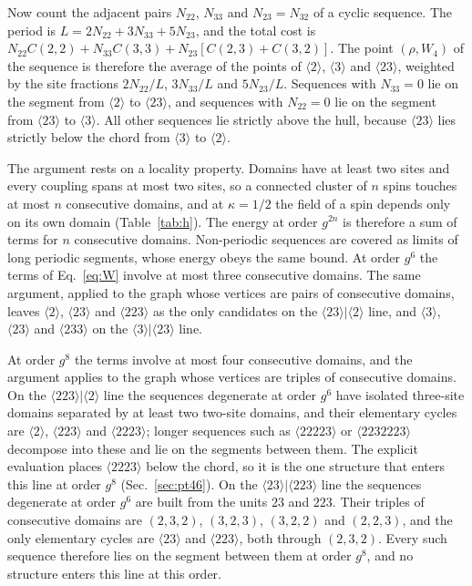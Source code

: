 \documentclass[
 aps,prb,
 twocolumn,
 superscriptaddress,
 longbibliography,
 nofootinbib,
 floatfix
]{revtex4-2}
\begin{document}
Now count the adjacent pairs $N_{22}$, $N_{33}$ and $N_{23}=N_{32}$ of a cyclic sequence. The period is
$L=2N_{22}+3N_{33}+5N_{23}$, and the total cost is $N_{22}C(2,2)+N_{33}C(3,3)+N_{23}[C(2,3)+C(3,2)]$. The point
$(\rho,W_4)$ of the sequence is therefore the average of the points of $\langle2\rangle$, $\langle3\rangle$ and
$\langle23\rangle$, weighted by the site fractions $2N_{22}/L$, $3N_{33}/L$ and $5N_{23}/L$. Sequences with
$N_{33}=0$ lie on the segment from $\langle2\rangle$ to $\langle23\rangle$, and sequences with $N_{22}=0$ lie on
the segment from $\langle23\rangle$ to $\langle3\rangle$. All other sequences lie strictly above the hull,
because $\langle23\rangle$ lies strictly below the chord from $\langle3\rangle$ to $\langle2\rangle$.

The argument rests on a locality property. Domains have at least two sites and every coupling spans at most two
sites, so a connected cluster of $n$ spins touches at most $n$ consecutive domains, and at $\kappa=1/2$ the field of
a spin depends only on its own domain (Table~\ref{tab:h}). The energy at order $g^{2n}$ is therefore a sum of terms for
$n$ consecutive domains. Non-periodic sequences are covered as limits of long periodic segments, whose energy obeys the
same bound. At order $g^6$ the terms of Eq.~\eqref{eq:W} involve at most three consecutive domains. The same argument,
applied to the graph whose vertices are pairs of consecutive domains, leaves $\langle2\rangle$,
$\langle23\rangle$ and $\langle223\rangle$ as the only candidates on the $\langle23\rangle|\langle2\rangle$
line, and $\langle3\rangle$, $\langle23\rangle$ and $\langle233\rangle$ on the $\langle3\rangle|\langle23\rangle$
line.

At order $g^8$ the terms involve at most four consecutive domains, and the argument applies to the graph whose
vertices are triples of consecutive domains. On the $\langle223\rangle|\langle2\rangle$ line the sequences degenerate
at order $g^6$ have isolated three-site domains separated by at least two two-site domains, and their elementary
cycles are $\langle2\rangle$, $\langle223\rangle$ and $\langle2223\rangle$; longer sequences such as $\langle22223\rangle$ or $\langle2232223\rangle$ decompose into
these and lie on the segments between them. The explicit evaluation places $\langle2223\rangle$ below the chord, so
it is the one structure that enters this line at order $g^8$ (Sec.~\ref{sec:pt46}). On the
$\langle23\rangle|\langle223\rangle$ line the sequences degenerate at order $g^6$ are built from the units $23$ and $223$.
Their triples of consecutive domains are $(2,3,2)$, $(3,2,3)$, $(3,2,2)$ and $(2,2,3)$, and the only elementary cycles
are $\langle23\rangle$ and $\langle223\rangle$, both through $(2,3,2)$. Every such sequence therefore lies on the segment
between them at order $g^8$, and no structure enters this line at this order.
\end{document}
